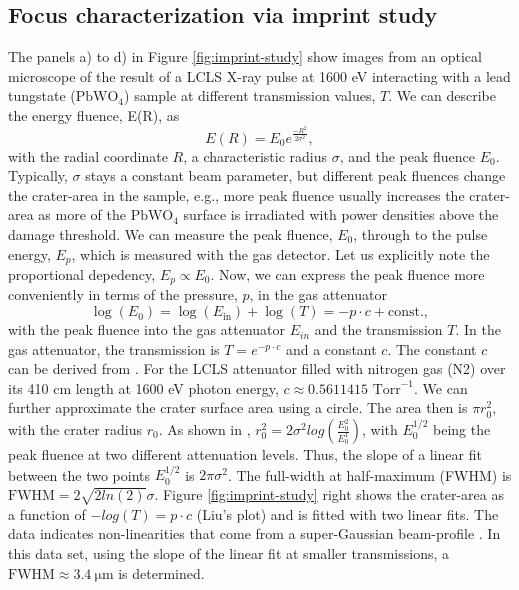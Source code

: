 \subsection{Focus characterization via imprint study}
%
The panels a) to d) in Figure \ref{fig:imprint-study} show images from an optical microscope of the result of a LCLS X-ray pulse at 1600 eV interacting with a lead tungstate ($\text{PbWO}_{4}$) sample at different transmission values, $T$. We can describe the energy fluence, E(R), as
\begin{equation}
E(R) = E_{0} e^{\frac{-R^{2}}{2 \sigma^{2}}},
\end{equation}
with the radial coordinate $R$, a characteristic radius $\sigma$, and the peak fluence $E_{0}$. Typically, $\sigma$ stays a constant beam parameter, but different peak fluences change the crater-area in the sample, e.g., more peak fluence usually increases the crater-area as more of the $\text{PbWO}_{4}$ surface is irradiated with power densities above the damage threshold. We can measure the peak fluence, $E_{0}$, through to the pulse energy, $E_{p}$, which is measured with the gas detector. Let us explicitly note the proportional depedency, $E_{p}\propto E_{0}$. Now, we can express the peak fluence more conveniently in terms of the pressure, $p$, in the gas attenuator
\begin{equation}
\log(E_{0}) = \log(E_{\text{in}})+\log(T)= -p \cdot c + \text{const.},
\label{eq:gaussian-beam-imprint}
\end{equation}
with the peak fluence into the gas attenuator $E_{in}$ and the transmission $T$. In the gas attenuator, the transmission is $T=e^{-p \cdot c}$ and a constant $c$. The constant $c$ can be derived from \citep{Henke-1993-ADNDT}. For the LCLS attenuator filled with nitrogen gas (N2) over its 410 cm length at 1600 eV photon energy, $c\approx 0.5611415 \text{ Torr}^{-1}$. We can further approximate the crater surface area using a circle. The area then is $\pi r_{0}^{2}$, with the crater radius $r_{0}$. As shown in \citep{Liu-1982-OptLett}, $r_{0}^{2}=2\sigma^{2}log(\frac{E_{0}^{2}}{E_{0}^{1}})$, with $E_{0}^{1/2}$ being the peak fluence at two different attenuation levels. Thus, the slope of a linear fit between the two points $E_{0}^{1/2}$ is $2 \pi \sigma^{2}$. The full-width at half-maximum (FWHM) is $\text{FWHM}=2\sqrt{2 ln(2)}\sigma$. Figure \ref{fig:imprint-study} right shows the crater-area as a function of $-log(T)= p \cdot c$ (Liu's plot) and is fitted with two linear fits. The data indicates non-linearities that come from a super-Gaussian beam-profile \citep{Chalupsky-2010-OE,Chalupsky-2013-OE}. In this data set, using the slope of the linear fit at smaller transmissions, a $\text{FWHM}\approx \SI{3.4}{\micro\meter}$ is determined.\\[1\baselineskip]
